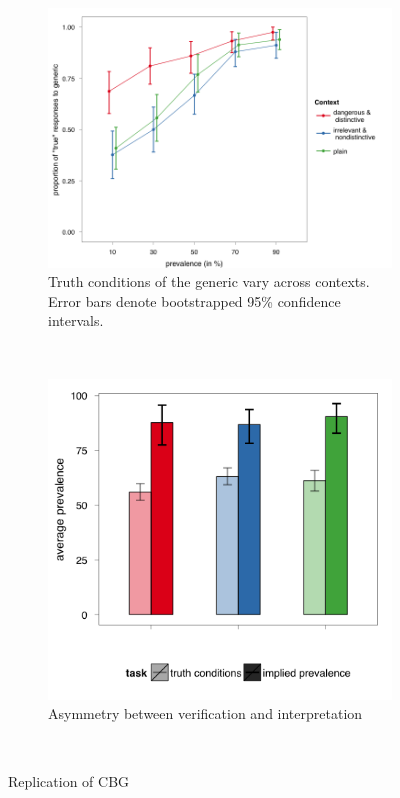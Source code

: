 \documentclass[10pt,letterpaper]{article}
\begin{document}
\begin{figure}
        \centering
        \begin{subfigure}[b]{0.55\columnwidth}
                \includegraphics[width=\columnwidth]{data_truthconditions1}
                \caption{Truth conditions of the generic vary across contexts. Error bars denote bootstrapped 95\% confidence intervals.}
                \label{fig:datatc}
        \end{subfigure}%
        ~ %
        \begin{subfigure}[b]{0.45\columnwidth}
                \includegraphics[width=\columnwidth]{data_asymmetry1}
                \caption{Asymmetry between verification and interpretation}
                \label{fig:datasym}
        \end{subfigure}
        ~ %
        \caption{Replication of CBG}\label{fig:exp1}
\end{figure}
\end{document}
